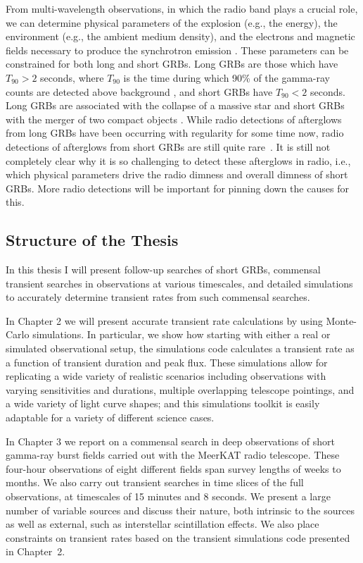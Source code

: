 \documentclass[12pt]{article}
\begin{document}
From multi-wavelength observations, in which the radio band plays a crucial role, we can determine physical parameters of the explosion (e.g., the energy), the environment (e.g., the ambient medium density), and the electrons and magnetic fields necessary to produce the synchrotron emission \citep{2014PASA...31....8G}. These parameters can be constrained for both long and short GRBs. Long GRBs are those which have $T_{90}>2$ seconds, where $T_{90}$ is the time during which 90\% of the gamma-ray counts are detected above background \citep{1993ApJ...413L.101K}, and short GRBs have $T_{90}<2$ seconds. Long GRBs are associated with the collapse of a massive star \citep{1998Natur.395..670G, 2003Natur.423..847H, 1993ApJ...405..273W} and short GRBs with the merger of two compact objects \citep{1989Natur.340..126E, 1992ApJ...395L..83N,2017PhRvL.119p1101A}. While radio detections of afterglows from long GRBs have been occurring with regularity for some time now, radio detections of afterglows from short GRBs are still quite rare~\citep{2015ApJ...815..102F}. It is still not completely clear why it is so challenging to detect these afterglows in radio, i.e., which physical parameters drive the radio dimness and overall dimness of short GRBs. More radio detections will be important for pinning down the causes for this.


\subsection{Structure of the Thesis}

In this thesis I will present follow-up searches of short GRBs, commensal transient searches in observations at various timescales, and detailed simulations to accurately determine transient rates from such commensal searches.

In Chapter 2 we will present accurate transient rate calculations by using Monte-Carlo simulations. In particular, we show how starting with either a real or simulated observational setup, the simulations code calculates a transient rate as a function of transient duration and peak flux. These simulations allow for replicating a wide variety of realistic scenarios including observations with varying sensitivities and durations, multiple overlapping telescope pointings, and a wide variety of light curve shapes; and this simulations toolkit is easily adaptable for a variety of different science cases.

In Chapter 3 we report on a commensal search in deep observations of short gamma-ray burst fields carried out with the MeerKAT radio telescope. These four-hour observations of eight different fields span survey lengths of weeks to months. We also carry out transient searches in time slices of the full observations, at timescales of 15 minutes and 8 seconds. We present a large number of variable sources and discuss their nature, both intrinsic to the sources as well as external, such as interstellar scintillation effects. We also place constraints on transient rates based on the transient simulations code presented in Chapter~2.
\end{document}
